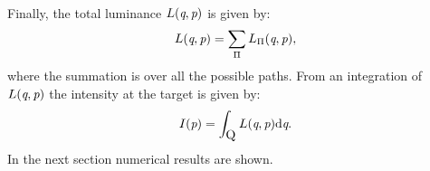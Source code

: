 \\ \indent Finally, the total luminance $L(\textit{q}, \textit{p})$ is given by:
\begin{equation}\label{eq:luminance_fresnel}
L(\textit{q}, \textit{p}) = \sum_{\Pi}L_{\Pi}(\textit{q}, \textit{p}),
\end{equation} 
where the summation is over all the possible paths. 
From an integration of $L(\textit{q}, \textit{p})$ the intensity at the target is given by:
\begin{equation}\label{eq:intensity_fresnel}
I(\textit{p}) = \int_{\mbox{$\textup{Q}_{\textit{}}$}}L(\textit{q}, \textit{p})\textrm{d}\textit{q}.
\end{equation}
In the next section numerical results are shown.
